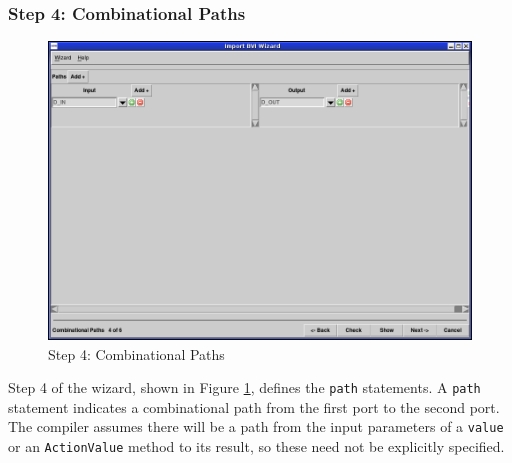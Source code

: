 \documentclass{article}
\newcommand{\te}[1]{\texttt{#1}}
\begin{document}




\subsubsection{Step 4: Combinational Paths}

\begin{figure}[htbp]
\begin{center}
\includegraphics[width = 5 in]{figures/importbvi4}
\caption{Step 4: Combinational Paths }
\label{fig-importbvi4}
\end{center}
\end{figure}

Step 4 of the wizard, shown in Figure \ref{fig-importbvi4}, defines
the \te{path} statements.  A \te{path} statement indicates  a
combinational path
from the first port to the second port.  The compiler assumes
there will be a path from the input parameters of a \te{value} or an
\te{ActionValue} method to its result, so these need not be explicitly
specified.
\end{document}

